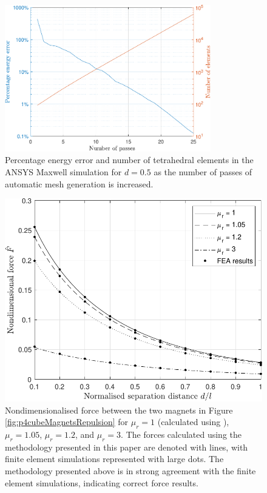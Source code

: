 \begin{figure}
    \centering
    \includegraphics[width=0.8\textwidth]{p4/p4FIG4}
    \caption{Percentage energy error and number of tetrahedral elements in the ANSYS Maxwell simulation for \(d = 0.5\) as the number of passes of automatic mesh generation is increased.}
    \label{fig:p4repulseConvergence}
\end{figure}
\begin{figure}
	\centering
	\includegraphics[width=0.8\linewidth]{p4/p4FIG5}
	\caption{Nondimensionalised force between the two magnets in Figure \ref{fig:p4cubeMagnetsRepulsion} for \(\mu_r = 1\) (calculated using \cite{Akoun1984}), \(\mu_r = 1.05\), \(\mu_r = 1.2\), and \(\mu_r = 3\). The forces calculated using the methodology presented in this paper are denoted with lines, with finite element simulations represented with large dots. The methodology presented above is in strong agreement with the finite element simulations, indicating correct force results.}
	\label{fig:p4cubeMagnetForces}
\end{figure}

